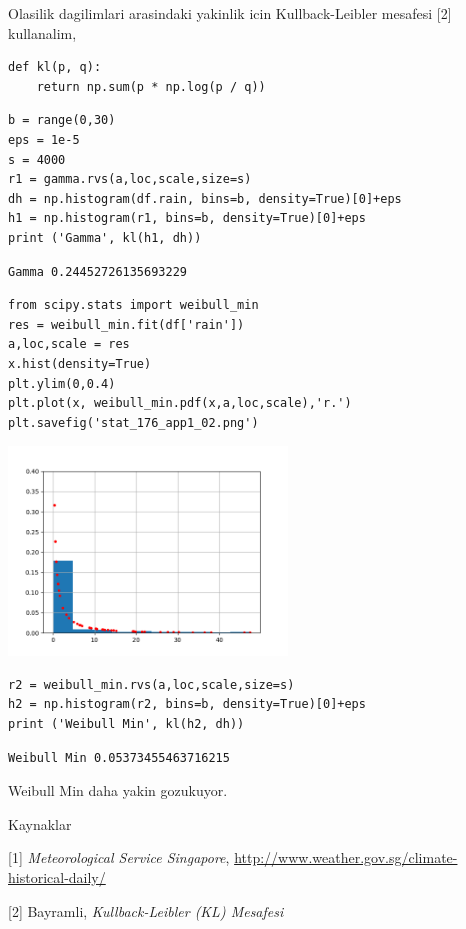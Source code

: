\documentclass[12pt,fleqn]{article}\usepackage{../../common}
\begin{document}
Olasilik dagilimlari arasindaki yakinlik icin Kullback-Leibler mesafesi [2]
kullanalim,

\begin{verbatim}
def kl(p, q):
    return np.sum(p * np.log(p / q))    
\end{verbatim}

\begin{verbatim}
b = range(0,30)
eps = 1e-5
s = 4000
r1 = gamma.rvs(a,loc,scale,size=s)
dh = np.histogram(df.rain, bins=b, density=True)[0]+eps
h1 = np.histogram(r1, bins=b, density=True)[0]+eps
print ('Gamma', kl(h1, dh))
\end{verbatim}

\begin{verbatim}
Gamma 0.24452726135693229
\end{verbatim}

\begin{verbatim}
from scipy.stats import weibull_min
res = weibull_min.fit(df['rain'])
a,loc,scale = res  
x.hist(density=True)
plt.ylim(0,0.4)
plt.plot(x, weibull_min.pdf(x,a,loc,scale),'r.')
plt.savefig('stat_176_app1_02.png')
\end{verbatim}

\includegraphics[width=20em]{stat_176_app1_02.png}

\begin{verbatim}
r2 = weibull_min.rvs(a,loc,scale,size=s)
h2 = np.histogram(r2, bins=b, density=True)[0]+eps
print ('Weibull Min', kl(h2, dh))
\end{verbatim}

\begin{verbatim}
Weibull Min 0.05373455463716215
\end{verbatim}

Weibull Min daha yakin gozukuyor.



Kaynaklar

[1] {\em Meteorological Service Singapore},
    \url{http://www.weather.gov.sg/climate-historical-daily/}

[2] Bayramli, {\em Kullback-Leibler (KL) Mesafesi}
    
\end{document}
